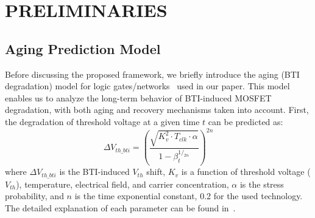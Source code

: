 \section{PRELIMINARIES}
\label{sec:preliminary}

\subsection{Aging Prediction Model}
\label{subsec:apm}
Before discussing the proposed framework, we briefly introduce the aging (BTI degradation) model for logic gates/networks~\cite{wang2010impact, wang2007efficient, gomez2016early, amrouch2016reliability} used in our paper. This model enables us to analyze the long-term behavior of BTI-induced MOSFET degradation, with both aging and recovery mechanisms taken into account. First, the degradation of threshold voltage at a given time $t$ can be predicted as:
\begin{equation}
\label{eq:dtv}
\Delta V_{th\_bti}=\left(\frac{\sqrt{K_v^2 \cdot T_{clk} \cdot \alpha}}{1-\beta_t^{1/_{2n}}}\right)^{2n}
\end{equation}
where $\Delta V_{th\_bti}$ is the BTI-induced $V_{th}$ shift, $K_v$ is a function of threshold voltage ($V_{th}$), temperature, electrical field, and carrier concentration, $\alpha$ is the stress probability, and $n$ is the time exponential constant, 0.2 for the used technology. The detailed explanation of each parameter can be found in~\cite{wang2010impact}. 

